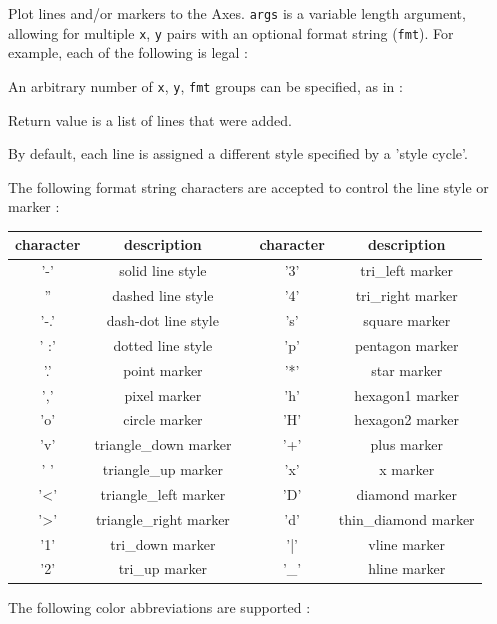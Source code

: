 \documentclass[10pt,fleqn]{article} %
\begin{document}
Plot lines and/or markers to the Axes. {\tt args} is a variable length argument, allowing for multiple {\tt x}, {\tt y} pairs with an optional format string ({\tt fmt}). For example, each of the following is legal :


An arbitrary number of {\tt x}, {\tt y}, {\tt fmt} groups can be specified, as in :



Return value is a list of lines that were added.

By default, each line is assigned a different style specified by a 'style cycle'.

The following format string characters are accepted to control the line style or marker :

\hfil
\begin{tabular}{|cc|c|cc|}
\hline
character &description & \quad &  character & description \\
\hline
'-' &  solid line style & & '3' &  tri\_left marker\\
'' &  dashed line style & &  '4' &  tri\_right marker\\
'-.' &  dash-dot line style & & 's' &  square marker\\
' :' &  dotted line style & & 'p' &  pentagon marker\\
'.' &  point marker & & '*' &  star marker\\
',' &  pixel marker & & 'h' &  hexagon1 marker\\
'o' &  circle marker & & 'H' &  hexagon2 marker\\
'v' &  triangle\_down marker & & '+' &  plus marker\\
' ' &  triangle\_up marker & & 'x' &  x marker\\
'<' &  triangle\_left marker & & 'D' &  diamond marker\\
'>' &  triangle\_right marker & & 'd' &  thin\_diamond marker\\
'1' &  tri\_down marker & & '|' &  vline marker\\
'2' &  tri\_up marker & & '\_' &  hline marker \\
\hline
\end{tabular}

The following color abbreviations are supported :
\end{document}
